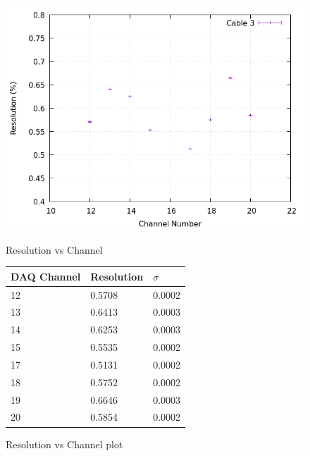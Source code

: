 \begin{figure}[h]
  \centering
  \begin{minipage}[b]{0.45\textwidth}
    \includegraphics[width=\textwidth]{img/plot/am/3_res_am.png}
    \caption{Resolution vs Channel}
    \label{res:am3}
  \end{minipage}
  \hfill
  \begin{minipage}[b]{0.45\textwidth}
  \begin{tabular}{lll}
    DAQ Channel & Resolution & $\sigma$ \\
    \midrule
    12 & \num{0.5708} & 0.0002 \\
    13 & \num{0.6413} & 0.0003 \\
    14 & \num{0.6253} & 0.0003 \\
    15 & \num{0.5535} & 0.0002 \\
    17 & \num{0.5131} & 0.0002 \\
    18 & \num{0.5752} & 0.0002 \\
    19 & \num{0.6646} & 0.0003 \\
    20 & \num{0.5854} & 0.0002 \\
    \bottomrule
  \end{tabular}
  \caption{Resolution vs Channel plot}
  \label{res:plot:am3}
  \end{minipage}
\end{figure}

